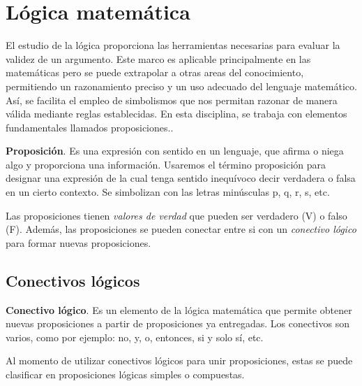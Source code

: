 \chapter{Lógica matemática}
\label{LM}


El estudio de la lógica proporciona las herramientas necesarias para evaluar la validez de un argumento. Este marco es aplicable principalmente en las matemáticas pero se puede extrapolar a otras areas del conocimiento, permitiendo un razonamiento preciso y un uso adecuado del lenguaje matemático. Así, se facilita el empleo de simbolismos que nos permitan razonar de manera válida mediante reglas establecidas. En esta disciplina, se trabaja con elementos fundamentales llamados proposiciones..\\

\begin{mydef}
\textbf{Proposición}. Es una expresión con sentido en un lenguaje, que afirma o niega algo y proporciona una información. Usaremos el término proposición para designar una expresión de la cual tenga sentido inequívoco decir verdadera o falsa en un cierto contexto. Se simbolizan con las letras minúsculas p, q, r, s, etc.
\end{mydef}

Las proposiciones tienen \textit{valores de verdad} que pueden ser verdadero (V) o falso (F). Además, las proposiciones se pueden conectar entre si con un \textit{conectivo lógico} para formar nuevas proposiciones.\\

\section{Conectivos lógicos}

\begin{mydef}
\textbf{Conectivo lógico}. Es un elemento de la lógica matemática que permite obtener nuevas proposiciones a partir de proposiciones ya entregadas. Los conectivos son varios, como por ejemplo: no, y, o, entonces, si y solo sí, etc.
\end{mydef}

Al momento de utilizar conectivos lógicos para unir proposiciones, estas se puede clasificar en proposiciones lógicas simples o compuestas.


